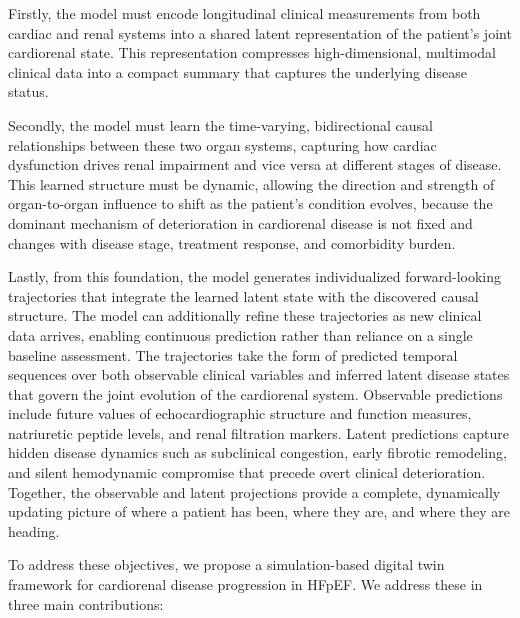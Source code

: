 \documentclass[pmlr]{jmlr}
\begin{document}
Firstly, the model must encode longitudinal clinical measurements from both cardiac and renal systems into a shared latent representation of the patient's joint cardiorenal state. This representation compresses high-dimensional, multimodal clinical data into a compact summary that captures the underlying disease status.

Secondly, the model must learn the time-varying, bidirectional causal relationships between these two organ systems, capturing how cardiac dysfunction drives renal impairment and vice versa at different stages of disease. This learned structure must be dynamic, allowing the direction and strength of organ-to-organ influence to shift as the patient's condition evolves, because the dominant mechanism of deterioration in cardiorenal disease is not fixed and changes with disease stage, treatment response, and comorbidity burden.

Lastly, from this foundation, the model generates individualized forward-looking trajectories that integrate the learned latent state with the discovered causal structure. The model can additionally refine these trajectories as new clinical data arrives, enabling continuous prediction rather than reliance on a single baseline assessment. The trajectories take the form of predicted temporal sequences over both observable clinical variables and inferred latent disease states that govern the joint evolution of the cardiorenal system. Observable predictions include future values of echocardiographic structure and function measures, natriuretic peptide levels, and renal filtration markers. Latent predictions capture hidden disease dynamics such as subclinical congestion, early fibrotic remodeling, and silent hemodynamic compromise that precede overt clinical deterioration. Together, the observable and latent projections provide a complete, dynamically updating picture of where a patient has been, where they are, and where they are heading.

To address these objectives, we propose a simulation-based digital twin framework for cardiorenal disease progression in HFpEF. We address these in three main contributions:
\end{document}
